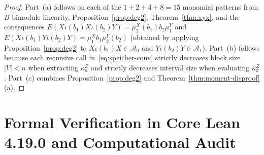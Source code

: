 \documentclass[11pt,a4paper]{article}
\theoremstyle{definition}
\begin{document}
\begin{proof}
Part~(a) follows on each of the $1 + 2 + 4 + 8 = 15$ monomial patterns from $B$-bimodule linearity, Proposition~\ref{prop:deg2}, Theorem~\ref{thm:xyx}, and the consequences $E(X \iota(b_1) X \iota(b_2) Y) = \mu_2^X(b_1) b_2 \mu_1^Y$ and $E(X \iota(b_1) Y \iota(b_2) Y) = \mu_1^X b_1 \mu_2^Y(b_2)$ (obtained by applying Proposition~\ref{prop:deg2} to $X \iota(b_1) X \in \mathcal{A}_0$ and $Y \iota(b_2) Y \in \mathcal{A}_1$). Part~(b) follows because each recursive call in~\eqref{eq:speicher-conv} strictly decreases block size $|V| < n$ when extracting $\kappa_n^Z$ and strictly decreases interval size when evaluating $\kappa_\pi^Z$. Part~(c) combines Proposition~\ref{prop:deg2} and Theorem~\ref{thm:moment-disproof}(a).
\end{proof}

\section{Formal Verification in Core Lean 4.19.0 and Computational Audit}
\end{document}
